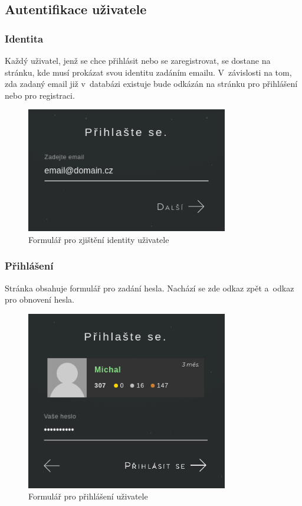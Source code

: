 \documentclass[a4paper,12pt]{article}
\begin{document}
\subsection{Autentifikace uživatele}

\subsubsection{Identita}

Každý uživatel, jenž se chce přihlásit nebo se zaregistrovat, se dostane na stránku, kde musí prokázat svou identitu zadáním emailu. V~závislosti na tom, zda zadaný email již v~databázi existuje bude odkázán na stránku pro přihlášení nebo pro registraci.

\begin{figure}[H]
\begin{center}
\includegraphics[width=250pt]{Images/Identity.png}
\caption{Formulář pro zjištění identity uživatele}
\label{Identity}
\end{center}
\end{figure}

\subsubsection{Přihlášení}

Stránka obsahuje formulář pro zadání hesla. Nachází se zde odkaz zpět a~odkaz pro obnovení hesla.

\begin{figure}[H]
\begin{center}
\includegraphics[width=250pt]{Images/SignIn.png}
\caption{Formulář pro přihlášení uživatele}
\label{SignIn}
\end{center}
\end{figure}
\end{document}
